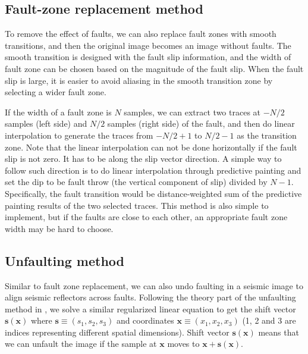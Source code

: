 \subsection{Fault-zone replacement method}

To remove the effect of faults, we can also replace fault zones with smooth transitions, and then the original image becomes an image without faults.
The smooth transition is designed with the fault slip information, and the width of fault zone can be chosen based on the magnitude of the fault slip.
When the fault slip is large, it is easier to avoid aliasing in the smooth transition zone by selecting a wider fault zone.

If the width of a fault zone is $N$ samples, we can extract two traces at $-N/2$ samples (left side) and $N/2$ samples (right side) of the fault, and then do linear interpolation to generate the traces from $-N/2+1$ to $N/2-1$ as the transition zone.
Note that the linear interpolation can not be done horizontally if the fault slip is not zero.
It has to be along the slip vector direction.
A simple way to follow such direction is to do linear interpolation through predictive painting and set the dip to be fault throw (the vertical component of slip) divided by $N-1$.
Specifically, the fault transition would be distance-weighted sum of the predictive painting results of the two selected traces.
This method is also simple to implement, but if the faults are close to each other, an appropriate fault zone width may be hard to choose.

\subsection{Unfaulting method}

Similar to fault zone replacement, we can also undo faulting in a seismic image to align seismic reflectors across faults.
Following the theory part of the unfaulting method in \cite{wu16}, we solve a similar regularized linear equation to get the shift vector $\mathbf s (\mathbf x)$ where $\mathbf s \equiv (s_1, s_2, s_3)$ and coordinates $\mathbf x \equiv (x_1, x_2, x_3)$ (1, 2 and 3 are indices representing different spatial dimensions).
Shift vector $\mathbf s (\mathbf x)$ means that we can unfault the image if the sample at $\mathbf x$ moves to $\mathbf x+\mathbf s(\mathbf x)$.

